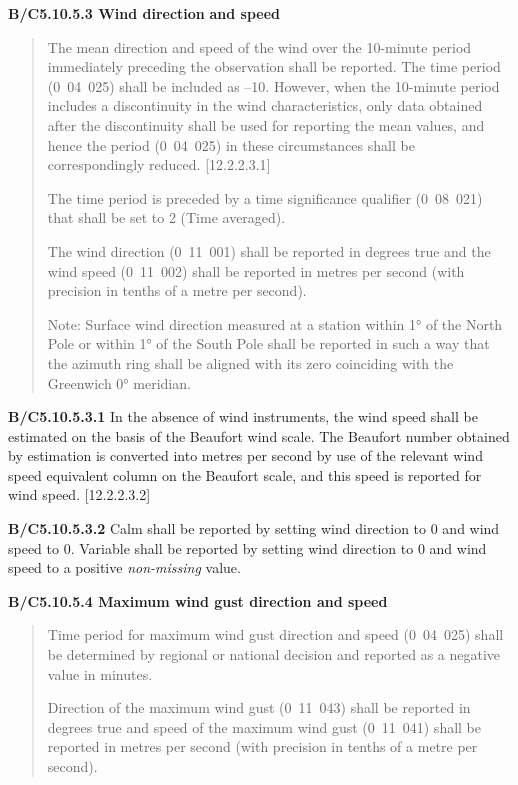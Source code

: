 \textbf{B/C5.10.5.3 Wind direction} \textbf{and speed}

\begin{quote}
The mean direction and speed of the wind over the 10-minute period immediately preceding the observation shall be reported. The time period (0~04~025) shall be included as --10. However, when the 10-minute period includes a discontinuity in the wind characteristics, only data obtained after the discontinuity shall be used for reporting the mean values, and hence the period (0~04~025) in these circumstances shall be correspondingly reduced. {[}12.2.2.3.1{]}

The time period is preceded by a time significance qualifier (0~08~021) that shall be set to 2 (Time averaged).

The wind direction (0~11~001) shall be reported in degrees true and the wind speed (0~11~002) shall be reported in metres per second (with precision in tenths of a metre per second).

Note: Surface wind direction measured at a station within 1° of the North Pole or within 1° of the South Pole shall be reported in such a way that the azimuth ring shall be aligned with its zero coinciding with the Greenwich 0° meridian.
\end{quote}

\textbf{B/C5.10.5.3.1} In the absence of wind instruments, the wind speed shall be estimated on the basis of the Beaufort wind scale. The Beaufort number obtained by estimation is converted into metres per second by use of the relevant wind speed equivalent column on the Beaufort scale, and this speed is reported for wind speed. {[}12.2.2.3.2{]}

\textbf{B/C5.10.5.3.2} Calm shall be reported by setting wind direction to 0 and wind speed to 0. Variable shall be reported by setting wind direction to 0 and wind speed to a positive \emph{non-missing} value.

\textbf{B/C5.10.5.4 Maximum wind gust direction and speed}

\begin{quote}
Time period for maximum wind gust direction and speed (0~04~025) shall be determined by regional or national decision and reported as a negative value in minutes.

Direction of the maximum wind gust (0~11~043) shall be reported in degrees true and speed of the maximum wind gust (0~11~041) shall be reported in metres per second (with precision in tenths of a metre per second).
\end{quote}

